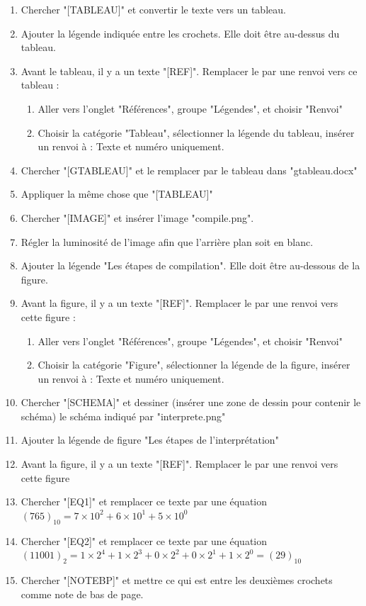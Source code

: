 \documentclass[11pt, a4paper]{article}
\begin{document}
\begin{enumerate}
	\item Chercher "[TABLEAU]" et convertir le texte vers un tableau. 
	\item Ajouter la légende indiquée entre les crochets. Elle doit être au-dessus du tableau. 
	\item Avant le tableau, il y a un texte "[REF]". Remplacer le par une renvoi vers ce tableau :
	\begin{enumerate}
		\item Aller vers l'onglet "Références", groupe "Légendes", et choisir "Renvoi"
		\item Choisir la catégorie "Tableau", sélectionner la légende du tableau, insérer un renvoi à : Texte et numéro uniquement.
	\end{enumerate}
	\item Chercher "[GTABLEAU]" et le remplacer par le tableau dans "gtableau.docx"
	\item Appliquer la même chose que "[TABLEAU]"
	\item Chercher "[IMAGE]" et insérer l'image "compile.png". 
	\item Régler la luminosité de l'image afin que l'arrière plan soit en blanc.
	\item Ajouter la légende "Les étapes de compilation". Elle doit être au-dessous de la figure. 
	\item Avant la figure, il y a un texte "[REF]". Remplacer le par une renvoi vers cette figure :
	\begin{enumerate}
		\item Aller vers l'onglet "Références", groupe "Légendes", et choisir "Renvoi"
		\item Choisir la catégorie "Figure", sélectionner la légende de la figure, insérer un renvoi à : Texte et numéro uniquement.
	\end{enumerate}
	\item Chercher "[SCHEMA]" et dessiner (insérer une zone de dessin pour contenir le schéma) le schéma indiqué par "interprete.png"
	\item Ajouter la légende de figure "Les étapes de l'interprétation"
	\item Avant la figure, il y a un texte "[REF]". Remplacer le par une renvoi vers cette figure
	\item Chercher "[EQ1]" et remplacer ce texte par une équation $ (765)_{10} = 7 \times 10^2 + 6 \times 10^1 + 5 \times 10^0 $
	\item Chercher "[EQ2]" et remplacer ce texte par une équation $ (11001)_{2} = 1 \times 2^4 + 1 \times 2^3 + 0 \times 2^2 + 0 \times 2^1 + 1 \times 2^0 = (29)_{10} $
	\item Chercher "[NOTEBP]" et mettre ce qui est entre les deuxièmes crochets comme note de bas de page. 
	
\end{enumerate}
\end{document}

